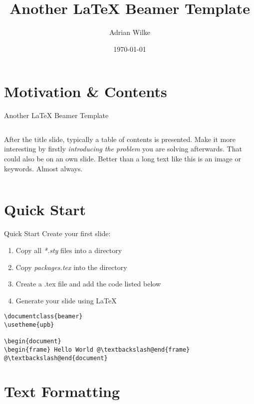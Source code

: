 \documentclass{beamer}
\author[A.~Wilke]{Adrian Wilke}
\institute[DICE]{DICE Group\\Paderborn University}
\title[Another LaTeX Beamer Template]{Another LaTeX Beamer Template}
\subtitle{}
\date{\today}
\begin{document}
{\usebackgroundtemplate{}
\frame[plain]{\titlepage}}
\addtocounter{framenumber}{-1}

\section{Motivation \& Contents}

\begin{frame}{Another LaTeX Beamer Template}
	\begin{columns}[T]
		After the title slide, typically a table of contents is presented. Make it more interesting by firstly \emph{introducing the problem} you are solving afterwards. That could also be on an own slide. Better than a long text like this is an image or keywords. Almost always.
		\vspace*{.2cm}
		\hypersetup{linkcolor=textblue}
		\tableofcontents
	\end{columns}
\end{frame}

\section{Quick Start}
\begin{frame}[fragile]{Quick Start}
	Create your first slide:
	\begin{enumerate}
		\item Copy all \emph{*.sty} files into a directory
		\item Copy \emph{packages.tex} into the directory
		\item Create a .tex file and add the code listed below
		\item Generate your slide using LaTeX
	\end{enumerate}
	\begin{lstlisting}[caption={Minimal Example}]
\documentclass{beamer}
\usetheme{upb}

\begin{document}
\begin{frame} Hello World @\textbackslash@end{frame}
@\textbackslash@end{document}
	\end{lstlisting}
\end{frame}

\section{Text Formatting}
\end{document}
